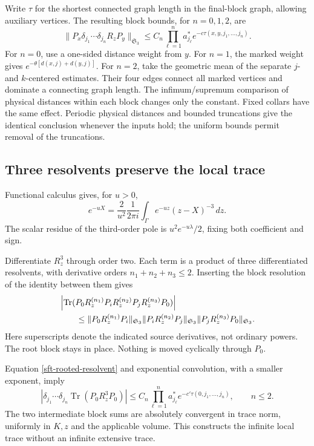 Write \(\tau\) for the shortest connected graph length in the
final-block graph, allowing auxiliary vertices. The resulting
block bounds, for \(n=0,1,2\), are
\begin{equation}
 \|P_x\delta_{j_1}\cdots\delta_{j_n}R_zP_y\|_{\mathfrak S_3}
 \le C_n\prod_{\ell=1}^n a_{j_\ell}^*
       e^{-c\tau(x,y,j_1,\ldots,j_n)}.
 \label{sft-rooted-resolvent}
\end{equation}
For \(n=0\), use a one-sided distance weight from \(y\).
For \(n=1\), the marked weight gives
\(e^{-\theta[d(x,j)+d(y,j)]}\). For \(n=2\), take the
geometric mean of the separate \(j\)- and \(k\)-centered estimates.
Their four edges connect all marked vertices and dominate a
connecting graph length. The infimum/supremum comparison of
physical distances within each block changes only the constant.
Fixed collars have the same effect. Periodic physical distances
and bounded truncations give the identical conclusion whenever the
inputs hold; the uniform bounds permit removal of the truncations.

\subsection{Three resolvents preserve the local trace}
\label{sft-heat-section}

Functional calculus gives, for \(u>0\),
\begin{equation}
 e^{-uX}=\frac{2}{u^2}\frac1{2\pi i}
       \int_\Gamma e^{-uz}(z-X)^{-3}\,dz .
 \label{sft-cubic-calculus}
\end{equation}
The scalar residue of the third-order pole is
\(u^2e^{-u\lambda}/2\), fixing both coefficient and sign.

Differentiate \(R_z^3\) through order two. Each term is a product of
three differentiated resolvents, with derivative orders
\(n_1+n_2+n_3\le2\). Inserting the block resolution of the identity
between them gives
\begin{align}
 &\left|\operatorname{Tr}
  (P_0R_z^{(n_1)}P_iR_z^{(n_2)}P_jR_z^{(n_3)}P_0)\right|
 \notag\\
 &\qquad\le
  \|P_0R_z^{(n_1)}P_i\|_{\mathfrak S_3}
  \|P_iR_z^{(n_2)}P_j\|_{\mathfrak S_3}
  \|P_jR_z^{(n_3)}P_0\|_{\mathfrak S_3}.
 \label{sft-local-holder}
\end{align}
Here superscripts denote the indicated source derivatives, not
ordinary powers. The root block stays in place. Nothing is moved
cyclically through \(P_0\).

Equation \eqref{sft-rooted-resolvent} and exponential convolution,
with a smaller exponent, imply
\begin{equation}
 \left|\delta_{j_1}\cdots\delta_{j_n}
       \operatorname{Tr}(P_0R_z^3P_0)\right|
 \le C_n\prod_{\ell=1}^n a_{j_\ell}^*
        e^{-c'\tau(0,j_1,\ldots,j_n)},\qquad n\le2.
 \label{sft-cubic-root}
\end{equation}
The two intermediate block sums are absolutely convergent in trace
norm, uniformly in \(K,z\) and the applicable volume. This constructs
the infinite local trace without an infinite extensive trace.

